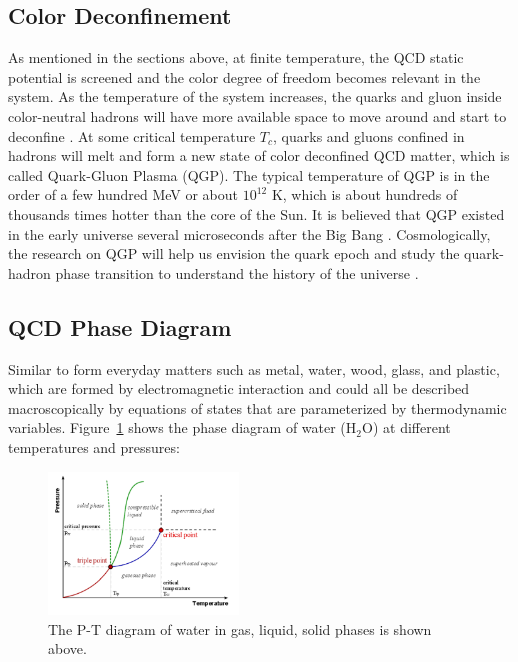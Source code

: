 \subsection{Color Deconfinement}

As mentioned in the sections above, at finite temperature, the QCD static potential is screened and the color degree of freedom becomes relevant in the system. As the temperature of the system increases, the quarks and gluon inside color-neutral hadrons will have more available space to move around and start to deconfine \cite{DeconfineTemp}. At some critical temperature $T_c$, quarks and gluons confined in hadrons will melt and form a new state of color deconfined QCD matter, which is called Quark-Gluon Plasma (QGP). The typical temperature of QGP is in the order of a few hundred MeV or about $10^{12}$ K, which is about hundreds of thousands times hotter than the core of the Sun. It is believed that QGP existed in the early universe several microseconds after the Big Bang \cite{QGPUniverse}. Cosmologically, the research on QGP will help us envision the quark epoch and study the quark-hadron phase transition to understand the history of the universe \cite{QHPhase}. 



\subsection{QCD Phase Diagram}

Similar to form everyday matters such as metal, water, wood, glass, and plastic, which are formed by electromagnetic interaction and could all be described macroscopically by equations of states that are parameterized by thermodynamic variables. 
\iffalse Figure~\ref{QEDPhaseDiagram} shows the phase diagram of water ($\mathrm{H_2O}$) at different temperatures and pressures:

\begin{figure}[hbtp]
\begin{center}
\includegraphics[width=0.45\textwidth]{Figures/Chapter1/WaterPhaseDiagram.png}
\caption{The P-T diagram of water in gas, liquid, solid phases is shown above.}
\label{QEDPhaseDiagram}
\end{center}
\end{figure} 

